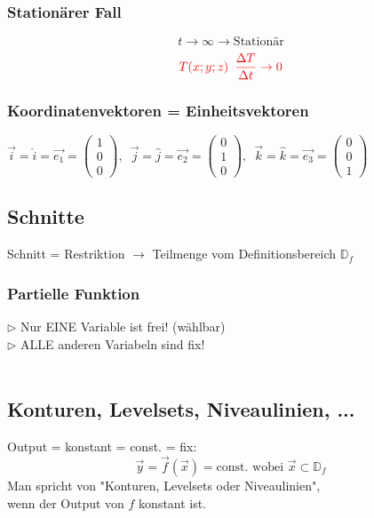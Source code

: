 \subsubsection{Stationärer Fall}
$${t \rightarrow \infty \rightarrow \text{Stationär}}$$
$${{\color{red}T(x;y;z) \enspace\frac{\Delta{T}}{\Delta{t}} \rightarrow 0 }}$$

\subsubsection{Koordinatenvektoren = Einheitsvektoren}
$\vec{i}=\hat{i}=\vec{{e}_1}=
\begin{pmatrix}
    1 \\
    0 \\
    0
\end{pmatrix},\enspace
\vec{j}=\hat{j}=\vec{{e}_2}=
\begin{pmatrix}
    0 \\
    1 \\
    0
\end{pmatrix},\enspace
\vec{k}=\hat{k}=\vec{{e}_3}=
\begin{pmatrix}
    0 \\
    0 \\
    1
\end{pmatrix}$

\subsection{Schnitte}
Schnitt = Restriktion $\rightarrow$ Teilmenge vom Definitionsbereich ${\mathbb{D}_f}$\\

\subsubsection{Partielle Funktion}
$\triangleright$ Nur EINE Variable ist frei! (wählbar)\\
$\triangleright$ ALLE anderen Variabeln sind fix!\\
\\[2mm]

\subsection{Konturen, Levelsets, Niveaulinien, ...}
Output = konstant = const. = fix: 
$$\vec{y} = \vec{f}(\vec{x}) = \text{const. wobei } \vec{x} \subset \mathbb{D}_f$$
Man spricht von "Konturen, Levelsets oder Niveaulinien",\\
wenn der Output von ${f}$ konstant ist.\\

